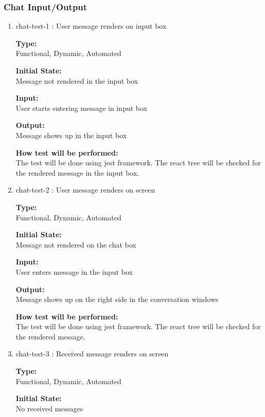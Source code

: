 \documentclass[12pt, titlepage]{article}
\begin{document}
\subsubsection{Chat Input/Output}
\label{sec:frontendtests}
\begin{enumerate}
   \item{chat-test-1 : User message renders on input box\\}

\textbf{Type:}\\ Functional, Dynamic, Automated 
					
\textbf{Initial State:}\\ Message not rendered in the input box 
					
\textbf{Input:}\\ User starts entering message in input box
					
\textbf{Output:}\\ Message shows up in the input box
					
\textbf{How test will be performed:}\\ 
The test will be done using jest framework. The react tree will be checked for the rendered message in the input box.

\item{chat-test-2 : User message renders on screen\\}

\textbf{Type:}\\ Functional, Dynamic, Automated 
					
\textbf{Initial State:}\\ Message not rendered on the chat box
					
\textbf{Input:}\\ User enters message in the input box
					
\textbf{Output:}\\ Message shows up on the right side in the conversation windows
					
\textbf{How test will be performed:}\\ 
The test will be done using jest framework. The react tree will be checked for the rendered message.

\item{chat-test-3 : Received message renders on screen\\}

\textbf{Type:}\\ Functional, Dynamic, Automated 
					
\textbf{Initial State:}\\ No received messages
					

\end{enumerate}
\end{document}
